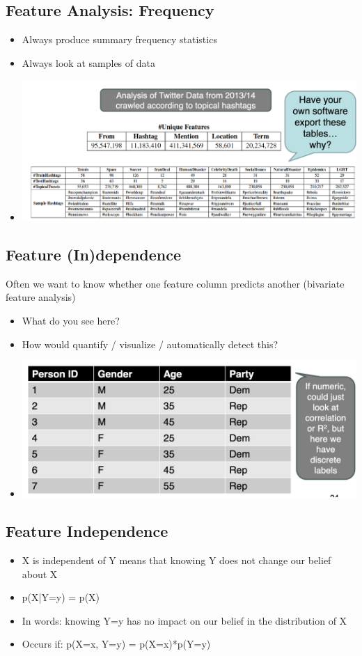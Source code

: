 \documentclass[11pt]{article}
\theoremstyle{definition}
\begin{document}
\subsection{Feature Analysis: Frequency}
\begin{itemize}
  \item Always produce summary frequency statistics
  \item Always look at samples of data
  \item \includegraphics[width=\textwidth/2]{11.png}
\end{itemize}
\subsection{Feature (In)dependence}
Often we want to know whether one feature column
predicts another (bivariate feature analysis)
\begin{itemize}
  \item What do you see here?
  \item How would quantify / visualize / automatically detect this?
  \item \includegraphics[width=\textwidth/2]{12.png}
\end{itemize}
\subsection{Feature Independence}
\begin{itemize}
  \item X is independent of Y means that knowing Y
  does not change our belief about X
  \item p(X|Y=y) = p(X)
  \item In words: knowing Y=y has no impact on
  our belief in the distribution of X
  \item Occurs if: p(X=x, Y=y) = p(X=x)*p(Y=y)
\end{itemize}
\end{document}
